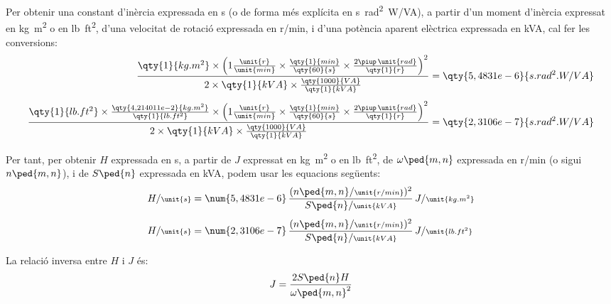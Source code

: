 Per  obtenir una constant d'inèrcia  expressada en \unit{s} (o de forma més explícita en \unit{s.rad^2.W/VA}), a partir d'un moment d'inèrcia expressat en \unit{kg.m^2} o en \unit{lb.ft^2}, d'una velocitat de rotació expressada en \unit{r/min}, i d'una potència aparent elèctrica expressada en \unit{kVA}, cal  fer les conversions:
\begin{subequations}
\begin{align}
    \frac{\qty{1}{kg.m^2} \times \left(1\frac{\unit{r}}{\unit{min}} \times \frac{\qty{1}{min}}{\qty{60}{s}} \times \frac{2\piup\,\unit{rad}}{\qty{1}{r}}\right)^2}{2\times \qty{1}{kVA} \times \frac{\qty{1000}{VA}}{\qty{1}{kVA}}}  &= \qty{5,4831e-6}{s.rad^2.W/VA} \\[1ex]
   \frac{\qty{1}{lb.ft^2} \times \frac{\qty{4,214011e-2}{kg.m^2}}{\qty{1}{lb.ft^2}} \times \left(1\frac{\unit{r}}{\unit{min}} \times \frac{\qty{1}{min}}{\qty{60}{s}} \times \frac{2\piup\,\unit{rad}}{\qty{1}{r}}\right)^2}{2\times \qty{1}{kVA}  \times
   \frac{\qty{1000}{VA}}{\qty{1}{kVA}}} &= \qty{2,3106e-7}{s.rad^2.W/VA}
\end{align}
\end{subequations}

Per tant, per  obtenir $H$ expressada en \unit{s}, a partir de $J$  expressat en \unit{kg.m^2} o en \unit{lb.ft^2}, de $\omega\ped{m,n}$ expressada en \unit{r/min} (o sigui $n\ped{m,n}$), i de $S\ped{n}$ expressada en \unit{kVA}, podem usar les equacions següents:
\begin{subequations}
\begin{align}
    H/{\scriptstyle \unit{s}} &= \num{5,4831e-6}\,  \frac{(n\ped{m,n}/{\scriptstyle \unit{r/min}})^2}{S\ped{n}/{\scriptstyle \unit{kVA}}} \, J/{\scriptstyle \unit{kg.m^2}} \\[1ex]
    H/{\scriptstyle \unit{s}} &= \num{2,3106e-7}\,  \frac{(n\ped{m,n}/{\scriptstyle \unit{r/min}})^2}{S\ped{n}/{\scriptstyle \unit{kVA}}} \, J/{\scriptstyle \unit{lb.ft^2}}
\end{align}
\end{subequations}

La relació inversa entre $H$ i $J$ és:
\begin{equation}
    J = \frac{2 S\ped{n} H}{\omega\ped{m,n}^2}
\end{equation}

